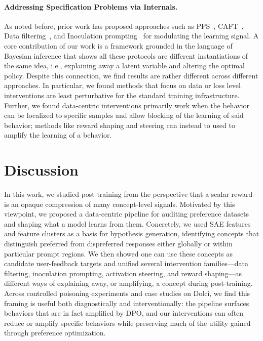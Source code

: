\documentclass{article} %
\begin{document}
\paragraph{Addressing Specification Problems via Internals.} As noted before, prior work has proposed approaches such as PPS~\citep{chen2025persona}, CAFT~\citep{casademunt2025steering}, Data filtering~\citep{rathi2026shaping}, and Inoculation prompting~\citep{tan2025inoculation, wichers2025inoculation} for modulating the learning signal.
% 
A core contribution of our work is a framework grounded in the language of Bayesian inference that shows all these protocols are different instantiations of the same idea, i.e., explaining away a latent variable and altering the optimal policy.
% 
Despite this connection, we find results are rather different across different approaches.
% 
In particular, we found methods that focus on data or loss level interventions are least perturbative for the standard training infrastructure.
% 
Further, we found data-centric interventions primarily work when the behavior can be localized to specific samples and allow blocking of the learning of said behavior; methods like reward shaping and steering can instead to used to amplify the learning of a behavior.



\section{Discussion}

In this work, we studied post-training from the perspective that a scalar reward is an opaque compression of many concept-level signals. Motivated by this viewpoint, we proposed a data-centric pipeline for auditing preference datasets and shaping what a model learns from them. Concretely, we used SAE features and feature clusters as a basis for hypothesis generation, identifying concepts that distinguish preferred from dispreferred responses either globally or within particular prompt regions. We then showed one can use these concepts as candidate user-feedback targets and unified several intervention families—data filtering, inoculation prompting, activation steering, and reward shaping---as different ways of explaining away, or amplifying, a concept during post-training. Across controlled poisoning experiments and case studies on Dolci, we find this framing is useful both diagnostically and interventionally: the pipeline surfaces behaviors that are in fact amplified by DPO, and our interventions can often reduce or amplify specific behaviors while preserving much of the utility gained through preference optimization.
\end{document}
